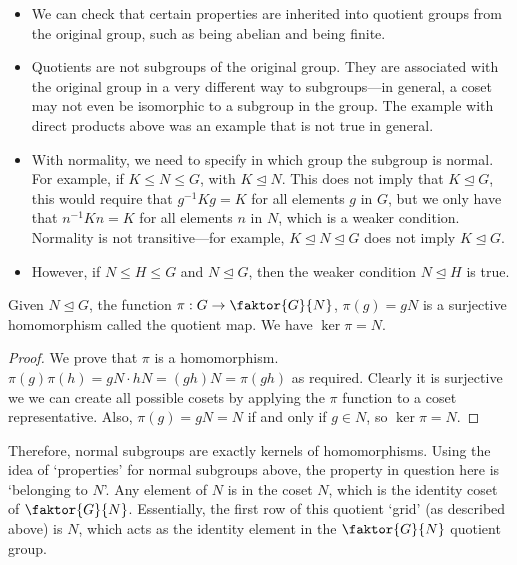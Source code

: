 \begin{itemize}
	\item We can check that certain properties are inherited into quotient groups from the original group, such as being abelian and being finite.
	\item Quotients are not subgroups of the original group.
	      They are associated with the original group in a very different way to subgroups---in general, a coset may not even be isomorphic to a subgroup in the group.
	      The example with direct products above was an example that is not true in general.
	\item With normality, we need to specify in which group the subgroup is normal.
	      For example, if \(K \leq N \leq G\), with \(K \trianglelefteq N\).
	      This does not imply that \(K \trianglelefteq G\), this would require that \(g^{-1}Kg = K\) for all elements \(g\) in \(G\), but we only have that \(n^{-1}Kn = K\) for all elements \(n\) in \(N\), which is a weaker condition.
	      Normality is not transitive---for example, \(K \trianglelefteq N \trianglelefteq G\) does not imply \(K \trianglelefteq G\).
	\item However, if \(N \leq H \leq G\) and \(N \trianglelefteq G\), then the weaker condition \(N \trianglelefteq H\) is true.
\end{itemize}

\begin{theorem}
	Given \(N \trianglelefteq G\), the function \(\pi: G \to \faktor{G}{N}\), \(\pi(g) = gN\) is a surjective homomorphism called the quotient map.
	We have \(\ker \pi = N\).
\end{theorem}
\begin{proof}
	We prove that \(\pi\) is a homomorphism.
	\(\pi(g)\pi(h) = gN \cdot hN = (gh)N = \pi(gh)\) as required.
	Clearly it is surjective we we can create all possible cosets by applying the \(\pi\) function to a coset representative.
	Also, \(\pi(g) = gN = N\) if and only if \(g \in N\), so \(\ker \pi = N\).
\end{proof}
Therefore, normal subgroups are exactly kernels of homomorphisms.
Using the idea of `properties' for normal subgroups above, the property in question here is `belonging to \(N\)'.
Any element of \(N\) is in the coset \(N\), which is the identity coset of \(\faktor{G}{N}\).
Essentially, the first row of this quotient `grid' (as described above) is \(N\), which acts as the identity element in the \(\faktor{G}{N}\) quotient group.
